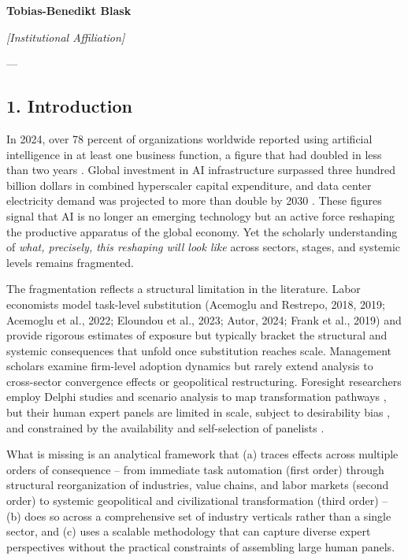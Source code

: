 \documentclass{article}
\begin{document}


\textbf{Tobias-Benedikt Blask}

\textit{[Institutional Affiliation]}

---


\subsection{1. Introduction}
\label{sec:1_introduction}

In 2024, over 78 percent of organizations worldwide reported using artificial intelligence in at least one business function, a figure that had doubled in less than two years \citep{chatterji2025chatgpt}. Global investment in AI infrastructure surpassed three hundred billion dollars in combined hyperscaler capital expenditure, and data center electricity demand was projected to more than double by 2030 \citep{iea2024electricity}. These figures signal that AI is no longer an emerging technology but an active force reshaping the productive apparatus of the global economy. Yet the scholarly understanding of \textit{what, precisely, this reshaping will look like} across sectors, stages, and systemic levels remains fragmented.

The fragmentation reflects a structural limitation in the literature. Labor economists model task-level substitution (Acemoglu and Restrepo, 2018, 2019; Acemoglu et al., 2022; Eloundou et al., 2023; Autor, 2024; Frank et al., 2019) and provide rigorous estimates of exposure but typically bracket the structural and systemic consequences that unfold once substitution reaches scale. Management scholars examine firm-level adoption dynamics \citep{raisch2021automation, kanbach2023genai, dwivedi2023chatgpt} but rarely extend analysis to cross-sector convergence effects or geopolitical restructuring. Foresight researchers employ Delphi studies and scenario analysis to map transformation pathways \citep{culot2020manufacturing, fritschy2019autonomous}, but their human expert panels are limited in scale, subject to desirability bias \citep{ecken2011desirability}, and constrained by the availability and self-selection of panelists \citep{foerster2014delphipanel, sokolov2025delphias}.

What is missing is an analytical framework that (a) traces effects across multiple orders of consequence -- from immediate task automation (first order) through structural reorganization of industries, value chains, and labor markets (second order) to systemic geopolitical and civilizational transformation (third order) -- (b) does so across a comprehensive set of industry verticals rather than a single sector, and (c) uses a scalable methodology that can capture diverse expert perspectives without the practical constraints of assembling large human panels.
\end{document}
